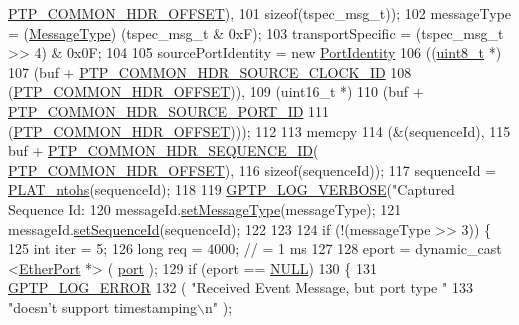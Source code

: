 \begin{DoxyCode}
{      \hyperlink{avbts__message_8hpp_a330dd502b6e19949d74c8f3a96dd5667}{PTP\_COMMON\_HDR\_OFFSET}),
101            \textcolor{keyword}{sizeof}(tspec\_msg\_t));
102     messageType = (\hyperlink{avbts__message_8hpp_ac6606ebe91c8ac66a2c314c79f5ab013}{MessageType}) (tspec\_msg\_t & 0xF);
103     transportSpecific = (tspec\_msg\_t >> 4) & 0x0F;
104 
105     sourcePortIdentity = \textcolor{keyword}{new} \hyperlink{class_port_identity}{PortIdentity}
106         ((\hyperlink{stdint_8h_aba7bc1797add20fe3efdf37ced1182c5}{uint8\_t} *)
107          (buf + \hyperlink{avbts__message_8hpp_ac56d471778da7bf419e64ecf2103ad9b}{PTP\_COMMON\_HDR\_SOURCE\_CLOCK\_ID}
108           (\hyperlink{avbts__message_8hpp_a330dd502b6e19949d74c8f3a96dd5667}{PTP\_COMMON\_HDR\_OFFSET})),
109          (uint16\_t *)
110          (buf + \hyperlink{avbts__message_8hpp_a53a15a915e51af626e90665cbcc6c443}{PTP\_COMMON\_HDR\_SOURCE\_PORT\_ID}
111           (\hyperlink{avbts__message_8hpp_a330dd502b6e19949d74c8f3a96dd5667}{PTP\_COMMON\_HDR\_OFFSET})));
112 
113     memcpy
114         (&(sequenceId),
115          buf + \hyperlink{avbts__message_8hpp_af717ee08477f9388e66fc5451971e6af}{PTP\_COMMON\_HDR\_SEQUENCE\_ID}(
      \hyperlink{avbts__message_8hpp_a330dd502b6e19949d74c8f3a96dd5667}{PTP\_COMMON\_HDR\_OFFSET}),
116          \textcolor{keyword}{sizeof}(sequenceId));
117     sequenceId = \hyperlink{linux_2src_2platform_8cpp_a6b8f3e7b87b66fa774a07ddc67f883a7}{PLAT\_ntohs}(sequenceId);
118 
119     \hyperlink{gptp__log_8hpp_add03384a2a8099b27e07d041cce77e6f}{GPTP\_LOG\_VERBOSE}(\textcolor{stringliteral}{"Captured Sequence Id: %
120     messageId.\hyperlink{class_p_t_p_message_id_a48ce86c4dfba93d4cf533b53f6c8ee86}{setMessageType}(messageType);
121     messageId.\hyperlink{class_p_t_p_message_id_a1a24ddc853c27de51012c1904f4181fe}{setSequenceId}(sequenceId);
122 
123 
124     \textcolor{keywordflow}{if} (!(messageType >> 3)) \{
125         \textcolor{keywordtype}{int} iter = 5;
126         \textcolor{keywordtype}{long} req = 4000;    \textcolor{comment}{// = 1 ms}
127 
128         eport = dynamic\_cast <\hyperlink{class_ether_port}{EtherPort} *> ( \hyperlink{gst__avb__playbin_8c_a63c89c04d1feae07ca35558055155ffb}{port} );
129         \textcolor{keywordflow}{if} (eport == \hyperlink{openavb__types__base__pub_8h_a070d2ce7b6bb7e5c05602aa8c308d0c4}{NULL})
130         \{
131             \hyperlink{gptp__log_8hpp_afefbb1009717c128012bfeed94842987}{GPTP\_LOG\_ERROR}
132                 ( \textcolor{stringliteral}{"Received Event Message, but port type "}
133                   \textcolor{stringliteral}{"doesn't support timestamping\(\backslash\)n"} );
}}
\end{DoxyCode}
